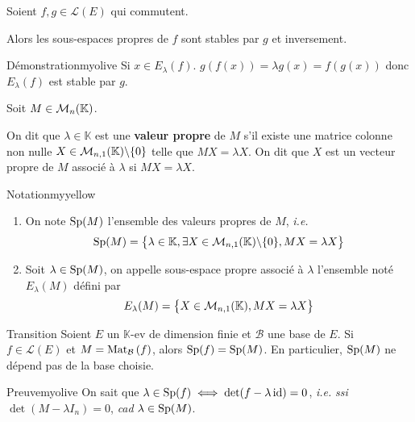     \begin{prop}{}{}
        Soient $f,g \in \mathcal{L}(E)$ qui commutent.

        Alors les sous-espaces propres de $f$ sont stables par $g$ et inversement.
    \end{prop}

    \begin{demo}{Démonstration}{myolive}
        Si $x \in E_{\lambda}(f)$. $g(f(x)) = \lambda g(x) = f(g(x))$ donc $E_{\lambda}(f)$ est stable par $g$.
    \end{demo}

    \begin{defi}{}{}
        Soit $M \in \mathcal{M}_{n}(\mathbb{K})$.

        On dit que $\lambda \in \mathbb{K}$ est une \textbf{valeur propre} de $M$ s’il existe une matrice colonne non nulle $X \in \mathcal{M}_{n,1}(\mathbb{K}) \backslash \{ 0 \}$ telle que $MX = \lambda X$. On dit que $X$ est un vecteur propre de $M$ associé à $\lambda$ si $MX = \lambda X$.
    \end{defi}

    \begin{omed}{Notation}{myyellow}
        \begin{enumerate}[label=\textcolor{myyellow}{\arabic*.}]
            \item On note $\operatorname{Sp}(M)$ l’ensemble des valeurs propres de $M$, \textit{i.e.} 
            \[ \operatorname{Sp}(M) = \big\{ \lambda \in \mathbb{K}, \exists X \in \mathcal{M}_{n,1}(\mathbb{K}) \backslash \{ 0 \}, MX = \lambda X \big\} \]
            \item Soit $\lambda \in \operatorname{Sp}(M)$, on appelle sous-espace propre associé à $\lambda$ l’ensemble noté $E_{\lambda}(M)$ défini par 
            \[ E_{\lambda}(M) = \big\{ X \in \mathcal{M}_{n,1}(\mathbb{K}), MX = \lambda X \big\} \]
        \end{enumerate}
    \end{omed}

    \begin{prop}{Transition}{}
        Soient $E$ un $\mathbb{K}$-ev de dimension finie et $\mathcal{B}$ une base de $E$. Si $f \in \mathcal{L}(E)$ et $M = \text{Mat}_{\mathcal{B}}\left(f\right)$, alors $\operatorname{Sp}(f) = \operatorname{Sp}(M)$. En particulier, $\operatorname{Sp}(M)$ ne dépend pas de la base choisie.
    \end{prop}

    \begin{demo}{Preuve}{myolive}
        On sait que $\lambda \in \operatorname{Sp}(f) \iff \operatorname{det}(f - \lambda \operatorname{id}) = 0$, \textit{i.e.} \textit{ssi} $\det(M - \lambda I_n) = 0$, \textit{cad} $\lambda \in \operatorname{Sp}(M)$.
    \end{demo}

